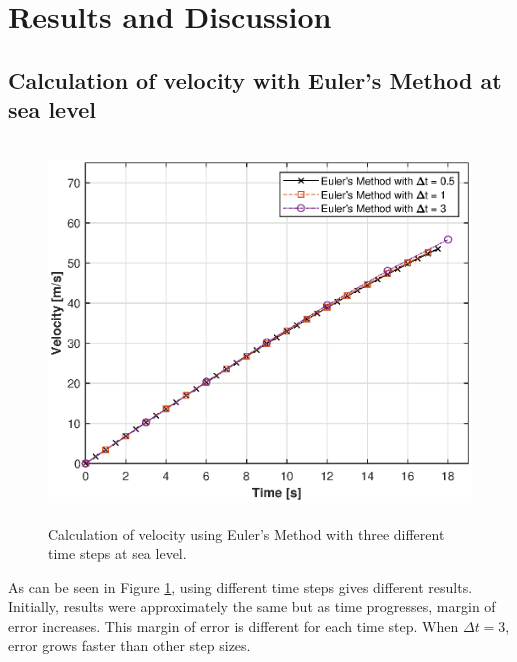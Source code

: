\documentclass[letterpaper,12pt]{article}
\begin{document}
\newpage

\section{Results and Discussion}

\subsection{Calculation of velocity with Euler's Method at sea level}
\begin{figure}[ht]
\centering \includegraphics[max height=10cm]{graphs/question1.eps}
\caption{Calculation of velocity using Euler's Method with three different time steps at sea level.}
     \label{fig:q1}
\end{figure}

As can be seen in Figure \ref{fig:q1}, using different time steps gives different results.
Initially, results were approximately the same but as time progresses, margin of error increases.
This margin of error is different for each time step. When $ \Delta t = 3 $, error grows faster than
other step sizes.
\end{document}
